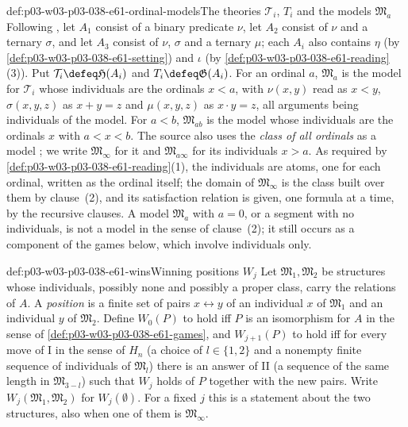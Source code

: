 \begin{hbdefinition}{def:p03-w03-p03-038-e61-ordinal-models}{The theories \(\mathcal T_i\), \(T_i\) and the models \(\mathfrak M_a\)}
Following \cite[p.~138]{Ehrenfeucht1961}, let \(A_1\) consist of a binary
predicate \(\nu\), let \(A_2\) consist of \(\nu\) and a ternary \(\sigma\),
and let \(A_3\) consist of \(\nu\), \(\sigma\) and a ternary \(\mu\); each
\(A_i\) also contains \(\eta\) (by \cref{def:p03-w03-p03-038-e61-setting})
and \(\iota\) (by \cref{def:p03-w03-p03-038-e61-reading}(3)). Put
\(\mathcal T_i\defeq\mathfrak H(A_i)\) and \(T_i\defeq\mathfrak G(A_i)\).
For an ordinal \(a\), \(\mathfrak M_a\) is the model for \(\mathcal T_i\)
whose individuals are the ordinals \(x<a\), with \(\nu(x,y)\) read as
\(x<y\), \(\sigma(x,y,z)\) as \(x+y=z\) and \(\mu(x,y,z)\) as
\(x\cdot y=z\), all arguments being individuals of the model. For
\(a<b\), \(\mathfrak M_{ab}\) is the model whose individuals are the
ordinals \(x\) with \(a<x<b\). The source also uses the \emph{class of
all ordinals} as a model \cite[p.~140]{Ehrenfeucht1961}; we write
\(\mathfrak M_\infty\) for it and \(\mathfrak M_{a\infty}\) for its
individuals \(x>a\). As required by
\cref{def:p03-w03-p03-038-e61-reading}(1), the individuals are atoms,
one for each ordinal, written as the ordinal itself; the domain of
\(\mathfrak M_\infty\) is the class built over them by clause~(2), and its
satisfaction relation is given, one formula at a time, by the recursive
clauses. A model \(\mathfrak M_a\) with \(a=0\), or a segment with no
individuals, is not a model in the sense of clause~(2); it still occurs as
a component of the games below, which involve individuals only.
\end{hbdefinition}

\begin{hbdefinition}{def:p03-w03-p03-038-e61-wins}{Winning positions \(W_j\)}
Let \(\mathfrak M_1,\mathfrak M_2\) be structures whose individuals,
possibly none and possibly a proper class, carry the relations of \(A\). A
\emph{position} is a finite set of pairs \(x\leftrightarrow y\) of an
individual \(x\) of \(\mathfrak M_1\) and an individual \(y\) of
\(\mathfrak M_2\). Define \(W_0(P)\) to hold iff \(P\) is an isomorphism
for \(A\) in the sense of \cref{def:p03-w03-p03-038-e61-games}, and
\(W_{j+1}(P)\) to hold iff for every move of I in the sense of \(H_n\)
(a choice of \(l\in\{1,2\}\) and a nonempty finite sequence of individuals
of \(\mathfrak M_l\)) there is an answer of II (a sequence of the same
length in \(\mathfrak M_{3-l}\)) such that \(W_j\) holds of \(P\) together
with the new pairs. Write \(W_j(\mathfrak M_1,\mathfrak M_2)\) for
\(W_j(\emptyset)\). For a fixed \(j\) this is a statement about the two
structures, also when one of them is \(\mathfrak M_\infty\).
\end{hbdefinition}

